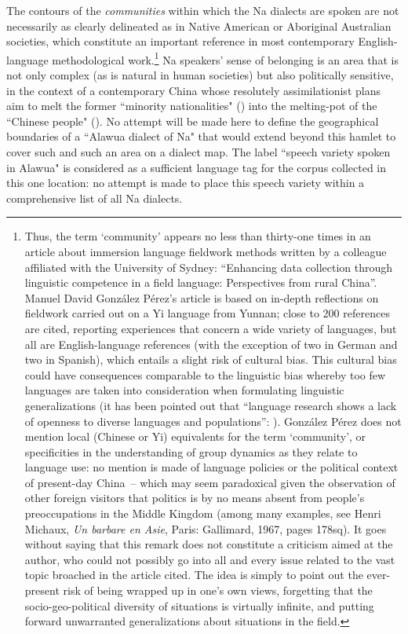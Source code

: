 The contours of the \emph{communities} within which the Na dialects are spoken are not necessarily as clearly delineated as in Native American or Aboriginal Australian societies, which constitute an important reference in most contemporary English-language methodological work.\footnote{Thus, the term `community' appears no less than thirty-one times in an article about immersion language fieldwork methods written by a colleague affiliated with the University of Sydney: “Enhancing data collection through linguistic competence in a field language: Perspectives from rural China”. Manuel David González Pérez's article is based on in-depth reflections on fieldwork carried out on a Yi language from Yunnan; close to 200 references are cited, reporting experiences that concern a wide variety of languages, but all are English-language references (with the exception of two in German and two in Spanish), which entails a slight risk of cultural bias. This cultural bias could have consequences comparable to the linguistic bias whereby too few languages are taken into consideration when formulating linguistic generalizations (it has been pointed out that “language research shows a lack of openness to diverse languages and populations”: \cite[23]{bochynska_reproducible_2023}). González Pérez does not mention local (Chinese or Yi) equivalents for the term `community', or specificities in the understanding of group dynamics as they relate to language use: no mention is made of language policies or the political context of present-day China~-- which may seem paradoxical given the observation of other foreign visitors that politics is by no means absent from people's preoccupations in the Middle Kingdom (among many examples, see Henri Michaux, \emph{Un barbare en Asie}, Paris: Gallimard, 1967, pages 178sq). It goes without saying that this remark does not constitute a criticism aimed at the author, who could not possibly go into all and every issue related to the vast topic broached in the article cited. The idea is simply to point out the ever-present risk of being wrapped up in one's own views, forgetting that the socio-geo-political diversity of situations is virtually infinite, and putting forward unwarranted generalizations about situations in the field.}
Na speakers' sense of belonging is an area that is not only complex (as is natural in human societies) but also politically sensitive, in the context of a contemporary China whose resolutely assimilationist plans aim to melt the former ``minority nationalities" () into the melting-pot of the ``Chinese people" (). No attempt will be made here to define the geographical boundaries of a ``Alawua dialect of Na" that would extend beyond this hamlet to cover such and such an area on a dialect map. The label ``speech variety spoken in Alawua" is considered as a sufficient language tag for the corpus collected in this one location: no attempt is made to place this speech variety within a comprehensive list of all Na dialects.

